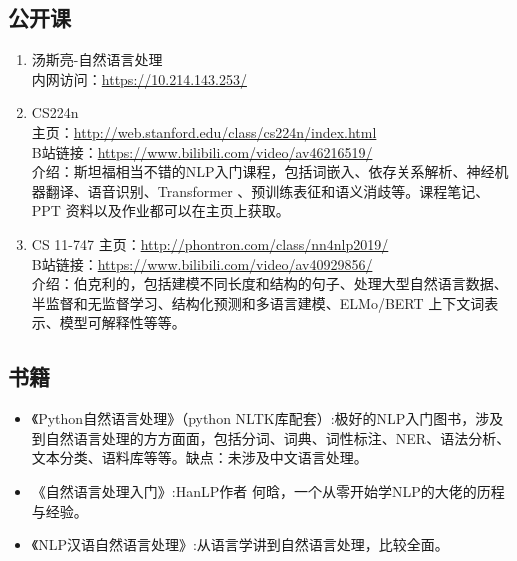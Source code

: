 \documentclass[lang=cn,11pt,a4paper]{elegant_template}
\begin{document}
\subsection{公开课}
\begin{enumerate}
    \item 汤斯亮-自然语言处理 \\
    内网访问：\href{https://10.214.143.253/}{https://10.214.143.253/} 
    \item CS224n \\
    主页：\href{http://web.stanford.edu/class/cs224n/index.html}{http://web.stanford.edu/class/cs224n/index.html} \\
    B站链接：\href{https://www.bilibili.com/video/av46216519/}{https://www.bilibili.com/video/av46216519/}  \\
    介绍：斯坦福相当不错的NLP入门课程，包括词嵌入、依存关系解析、神经机器翻译、语音识别、Transformer 、预训练表征和语义消歧等。课程笔记、PPT 资料以及作业都可以在主页上获取。
    \item CS 11-747
    主页：\href{http://phontron.com/class/nn4nlp2019/}{http://phontron.com/class/nn4nlp2019/}  \\
    B站链接：\href{https://www.bilibili.com/video/av40929856/}{https://www.bilibili.com/video/av40929856/}  \\
    介绍：伯克利的，包括建模不同长度和结构的句子、处理大型自然语言数据、半监督和无监督学习、结构化预测和多语言建模、ELMo/BERT 上下文词表示、模型可解释性等等。
\end{enumerate}


\subsection{书籍}
\begin{itemize}
    \item 《Python自然语言处理》（python NLTK库配套）:极好的NLP入门图书，涉及到自然语言处理的方方面面，包括分词、词典、词性标注、NER、语法分析、文本分类、语料库等等。缺点：未涉及中文语言处理。
    \item 《自然语言处理入门》:HanLP作者 何晗，一个从零开始学NLP的大佬的历程与经验。
    \item 《NLP汉语自然语言处理》:从语言学讲到自然语言处理，比较全面。
\end{itemize}
\end{document}
